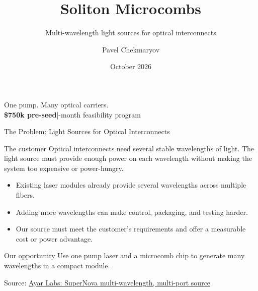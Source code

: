\documentclass[aspectratio=169,10pt]{beamer}
\title{Soliton Microcombs}
\subtitle{Multi-wavelength light sources for optical interconnects}
\author{Pavel Chekmaryov}
\institute{\href{mailto:p@occurai.com}{p@occurai.com}}
\date{October 2026}
\newcommand{\source}[2]{\vfill{\tiny Source: \href{#1}{#2}}}
\begin{document}
\begin{frame}
\titlepage
\centering\large One pump. Many optical carriers.\\[3mm]
\normalsize\textbf{\$750k pre-seed}\quad |-month feasibility program
\end{frame}

\begin{frame}{The Problem: Light Sources for Optical Interconnects}
\begin{block}{The customer}
Optical interconnects need several stable wavelengths of light. The light source must provide enough power on each wavelength without making the system too expensive or power-hungry.
\end{block}
\begin{itemize}
\item Existing laser modules already provide several wavelengths across multiple fibers.
\item Adding more wavelengths can make control, packaging, and testing harder.
\item Our source must meet the customer's requirements and offer a measurable cost or power advantage.
\end{itemize}
\begin{exampleblock}{Our opportunity}
Use one pump laser and a microcomb chip to generate many wavelengths in a compact module.
\end{exampleblock}
\source{https://ayarlabs.com/supernova}{Ayar Labs: SuperNova multi-wavelength, multi-port source}
\end{frame}
\end{document}
